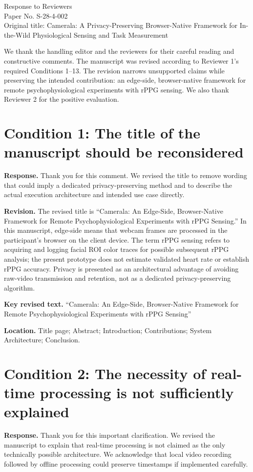 \documentclass[11pt]{article}
\newcommand{\condition}[2]{\section*{Condition #1: #2}}
\begin{document}
\begin{center}
{\Large Response to Reviewers}\\[4pt]
Paper No. S-28-4-002\\
Original title: Camerala: A Privacy-Preserving Browser-Native Framework for In-the-Wild Physiological Sensing and Task Measurement
\end{center}

We thank the handling editor and the reviewers for their careful reading and constructive comments.
The manuscript was revised according to Reviewer 1's required Conditions 1--13.
The revision narrows unsupported claims while preserving the intended contribution: an edge-side, browser-native framework for remote psychophysiological experiments with rPPG sensing.
We also thank Reviewer 2 for the positive evaluation.

\condition{1}{The title of the manuscript should be reconsidered}
\textbf{Response.}
Thank you for this comment.
We revised the title to remove wording that could imply a dedicated privacy-preserving method and to describe the actual execution architecture and intended use case directly.

\textbf{Revision.}
The revised title is ``Camerala: An Edge-Side, Browser-Native Framework for Remote Psychophysiological Experiments with rPPG Sensing.''
In this manuscript, edge-side means that webcam frames are processed in the participant's browser on the client device.
The term rPPG sensing refers to acquiring and logging facial ROI color traces for possible subsequent rPPG analysis; the present prototype does not estimate validated heart rate or establish rPPG accuracy.
Privacy is presented as an architectural advantage of avoiding raw-video transmission and retention, not as a dedicated privacy-preserving algorithm.

\textbf{Key revised text.}
``Camerala: An Edge-Side, Browser-Native Framework for Remote Psychophysiological Experiments with rPPG Sensing''

\textbf{Location.}
Title page; Abstract; Introduction; Contributions; System Architecture; Conclusion.

\condition{2}{The necessity of real-time processing is not sufficiently explained}
\textbf{Response.}
Thank you for this important clarification.
We revised the manuscript to explain that real-time processing is not claimed as the only technically possible architecture.
We acknowledge that local video recording followed by offline processing could preserve timestamps if implemented carefully.
\end{document}
